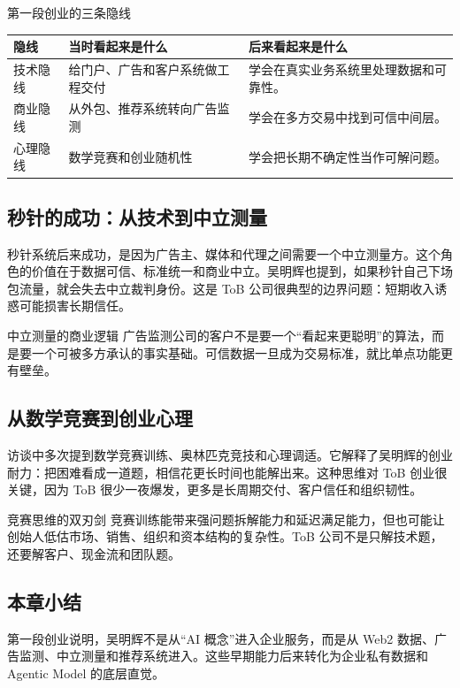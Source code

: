 \begin{knowledgebox}{第一段创业的三条隐线}
\begin{tabularx}{\textwidth}{p{}p{}X}
\toprule
隐线 & 当时看起来是什么 & 后来看起来是什么 \\
\midrule
技术隐线 & 给门户、广告和客户系统做工程交付 & 学会在真实业务系统里处理数据和可靠性。 \\
商业隐线 & 从外包、推荐系统转向广告监测 & 学会在多方交易中找到可信中间层。 \\
心理隐线 & 数学竞赛和创业随机性 & 学会把长期不确定性当作可解问题。 \\
\bottomrule
\end{tabularx}
\end{knowledgebox}

\subsection{秒针的成功：从技术到中立测量}

秒针系统后来成功，是因为广告主、媒体和代理之间需要一个中立测量方。这个角色的价值在于数据可信、标准统一和商业中立。吴明辉也提到，如果秒针自己下场包流量，就会失去中立裁判身份。这是 ToB 公司很典型的边界问题：短期收入诱惑可能损害长期信任。

\begin{knowledgebox}{中立测量的商业逻辑}
广告监测公司的客户不是要一个“看起来更聪明”的算法，而是要一个可被多方承认的事实基础。可信数据一旦成为交易标准，就比单点功能更有壁垒。
\end{knowledgebox}

\subsection{从数学竞赛到创业心理}

访谈中多次提到数学竞赛训练、奥林匹克竞技和心理调适。它解释了吴明辉的创业耐力：把困难看成一道题，相信花更长时间也能解出来。这种思维对 ToB 创业很关键，因为 ToB 很少一夜爆发，更多是长周期交付、客户信任和组织韧性。

\begin{warningbox}{竞赛思维的双刃剑}
竞赛训练能带来强问题拆解能力和延迟满足能力，但也可能让创始人低估市场、销售、组织和资本结构的复杂性。ToB 公司不是只解技术题，还要解客户、现金流和团队题。
\end{warningbox}

\subsection{本章小结}

第一段创业说明，吴明辉不是从“AI 概念”进入企业服务，而是从 Web2 数据、广告监测、中立测量和推荐系统进入。这些早期能力后来转化为企业私有数据和 Agentic Model 的底层直觉。

